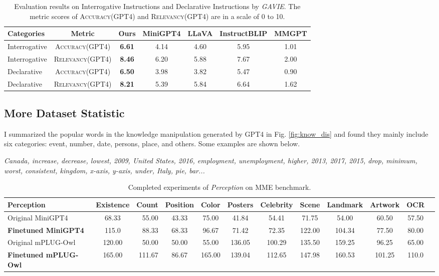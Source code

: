 \begin{table}[h]
\centering
\small
\begin{tabular}{lcccccc}
\toprule[1.5pt]
Categories & Metric &Ours & MiniGPT4 & LLaVA & InstructBLIP & MMGPT\\
\midrule
Interrogative&\textsc{Accuracy(GPT4)} & \textbf{6.61} &  4.14 & 4.60 & 5.95 & 1.01\\
Interrogative&\textsc{Relevancy(GPT4)} & \textbf{8.46} &  6.20 & 5.88 & 7.67 & 2.00\\
\midrule
Declarative&\textsc{Accuracy(GPT4)} & \textbf{6.50} & 3.98 & 3.82 & 5.47 & 0.90\\
Declarative&\textsc{Relevancy(GPT4)} & \textbf{8.21} & 5.39 & 5.84 & 6.64 & 1.62\\
\bottomrule[1.5pt]
\end{tabular}
\vspace{0.05in}
\caption{
Evaluation results on Interrogative Instructions and Declarative Instructions by \textit{GAVIE}. The metric scores of \textsc{Accuracy(GPT4)} and \textsc{Relevancy(GPT4)} are in a scale of 0 to 10.
}
\label{tab:Interrogative}
\vspace{-0.2in}
\end{table}


\subsection{More Dataset Statistic}
I summarized the popular words in the knowledge manipulation generated by GPT4 in Fig. \ref{fig:know_dis} and found they mainly include six categories: event, number, date, persons, place, and others. Some examples are shown below.

\textit{Canada, increase, decrease, lowest, 2009, United States, 2016, employment, unemployment, higher, 2013, 2017, 2015, drop, minimum, worst, consistent, kingdom, x-axis, y-axis, under, Italy, pie, bar...}



\begin{table}[t]
\setlength\tabcolsep{1pt}
\centering
\small
\begin{tabular}{lcrccccccccc}
\toprule[1.5pt]
Perception& Existence&Count & Position & Color & Posters & Celebrity& Scene & Landmark & Artwork & OCR\\
\midrule
Original MiniGPT4 & 68.33&55.00&43.33&75.00&41.84&54.41&71.75&54.00&60.50&57.50\\
\textbf{Finetuned MiniGPT4} & 115.0&88.33&68.33&96.67&71.42&72.35&122.00&104.34&77.50&80.00&\\
Original mPLUG-Owl & 120.00&50.00&50.00&55.00&136.05&100.29&135.50&159.25&96.25&65.00\\
\textbf{Finetuned mPLUG-Owl} & 165.00&111.67&86.67&165.00&139.04&112.65&147.98&160.53&101.25& 110.0\\
\midrule
\end{tabular}
\vspace{2mm}
\caption{Completed experiments of \textit{Perception} on MME \cite{fu2023mme} benchmark. }
\label{tab:mme_preception}
\vspace{-0.1in}
\end{table}

